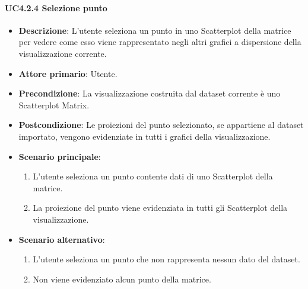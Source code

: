 \paragraph{UC4.2.4 Selezione punto}
\label{par:uc4.2.4}
\begin{itemize}
    \item \textbf{Descrizione}: L'utente seleziona un punto in uno Scatterplot della matrice per vedere come 
                                esso viene rappresentato negli altri grafici a dispersione della visualizzazione corrente.
	
    \item \textbf{Attore primario}: Utente.
    
    \item \textbf{Precondizione}:   La visualizzazione costruita dal dataset corrente è uno Scatterplot Matrix.
    \item \textbf{Postcondizione}:  Le proiezioni del punto selezionato, se appartiene al dataset importato, 
                                    vengono evidenziate in tutti i grafici della visualizzazione.

	\item \textbf{Scenario principale}:
        \begin{enumerate}
            \item L'utente seleziona un punto contente dati di uno Scatterplot della matrice.
            \item La proiezione del punto viene evidenziata in tutti gli Scatterplot della visualizzazione.
        \end{enumerate}

    \item \textbf{Scenario alternativo}:
        \begin{enumerate}
            \item L'utente seleziona un punto che non rappresenta nessun dato del dataset.
            \item Non viene evidenziato alcun punto della matrice.
        \end{enumerate}

\end{itemize}


